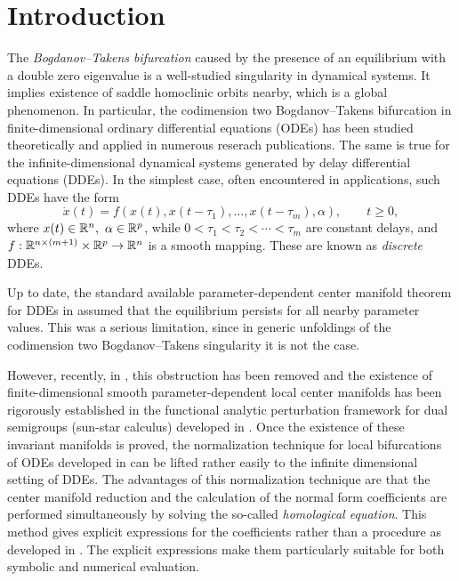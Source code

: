 \section{Introduction} 
The {\it Bogdanov--Takens bifurcation} caused by the presence of an equilibrium with a double zero eigenvalue is a well-studied singularity in dynamical systems.  It implies existence of saddle homoclinic orbits nearby, which is a global phenomenon. In particular, the codimension two Bogdanov--Takens bifurcation in finite-dimensional ordinary differential equations (ODEs) has been studied theoretically and applied in numerous reserach publications. The same is true for the infinite-dimensional dynamical systems generated by delay differential equations (DDEs). In the simplest case, often encountered in applications, such DDEs have the form
%
\begin{equation}
    \label{btdde:eq:discreteDDEs} 
    \dot{x}(t) = f(x(t),x(t-\tau_1),\ldots,x(t-\tau_m),\alpha),
    \qquad t \geq 0,
\end{equation}
%
where $x(t) \in \mathbb{R}^n,\ \alpha \in \mathbb{R}^p$, while $0 < \tau_1 < \tau_2 < \cdots <\tau_m$ are constant delays, and $f : \mathbb{R}^{n \times (m + 1)} \times \mathbb{R}^p \to \mathbb{R}^n$ is a smooth mapping. These are known as \emph{discrete} DDEs.

Up to date, the standard available parameter-dependent center manifold theorem for DDEs in \cite{diekmann1995delay} assumed that the equilibrium persists for all nearby parameter values. This was a serious limitation, since in generic
unfoldings of the codimension two Bogdanov--Takens singularity it is not the case.

However, recently, in \cite{Switching2019}, this obstruction has been removed and the existence of finite-dimensional smooth parameter-dependent local center manifolds has been rigorously established in the functional analytic perturbation framework for dual semigroups (sun-star calculus) developed in \cite{Clement1987, Clement1988, Clement1989, Clement1989b}. Once the existence of these invariant manifolds is proved, the normalization technique for local bifurcations of ODEs developed in \cite{Kuznetsov1999} can be lifted rather easily to the infinite dimensional setting of DDEs. The advantages of this normalization technique are that the center manifold reduction and the calculation of the normal form coefficients are performed simultaneously by solving the so-called \emph{homological equation}. This method gives explicit expressions for the coefficients rather than a procedure as developed in \cite{Faria1995201, Faria1995}. The explicit expressions make them particularly suitable for both symbolic and numerical evaluation.

